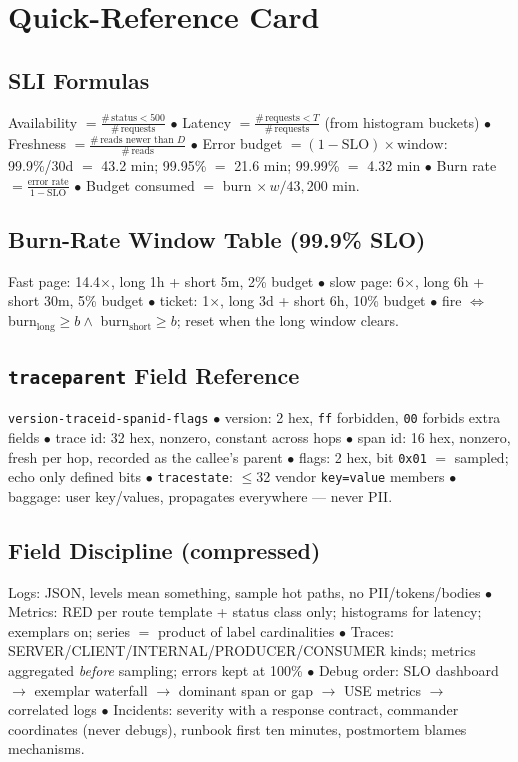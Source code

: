 \section{Quick-Reference Card}
\label{sec:ch18-quickref}

\subsection*{SLI Formulas}
Availability $= \frac{\#\,\text{status} < 500}{\#\,\text{requests}}$
$\bullet$ Latency $= \frac{\#\,\text{requests} < T}{\#\,\text{requests}}$
(from histogram buckets) $\bullet$ Freshness $= \frac{\#\,\text{reads newer
than } D}{\#\,\text{reads}}$ $\bullet$ Error budget $= (1-\text{SLO}) \times
\text{window}$: 99.9\%/30d $=$ 43.2 min; 99.95\% $=$ 21.6 min; 99.99\% $=$
4.32 min $\bullet$ Burn rate $= \frac{\text{error rate}}{1 - \text{SLO}}$
$\bullet$ Budget consumed $=$ burn $\times\, w / 43{,}200$ min.

\subsection*{Burn-Rate Window Table (99.9\% SLO)}
Fast page: 14.4$\times$, long 1h + short 5m, 2\% budget $\bullet$ slow
page: 6$\times$, long 6h + short 30m, 5\% budget $\bullet$ ticket:
1$\times$, long 3d + short 6h, 10\% budget $\bullet$ fire $\iff$
burn$_{\text{long}} \ge b \land$ burn$_{\text{short}} \ge b$; reset when
the long window clears.

\subsection*{\texttt{traceparent} Field Reference}
\texttt{version-traceid-spanid-flags} $\bullet$ version: 2 hex,
\texttt{ff} forbidden, \texttt{00} forbids extra fields $\bullet$ trace id:
32 hex, nonzero, constant across hops $\bullet$ span id: 16 hex, nonzero,
fresh per hop, recorded as the callee's parent $\bullet$ flags: 2 hex, bit
\texttt{0x01} $=$ sampled; echo only defined bits $\bullet$
\texttt{tracestate}: $\le$32 vendor \texttt{key=value} members $\bullet$
baggage: user key/values, propagates everywhere --- never PII.

\subsection*{Field Discipline (compressed)}
Logs: JSON, levels mean something, sample hot paths, no PII/tokens/bodies
$\bullet$ Metrics: RED per route template + status class only; histograms
for latency; exemplars on; series $=$ product of label cardinalities
$\bullet$ Traces: SERVER/CLIENT/INTERNAL/PRODUCER/CONSUMER kinds; metrics
aggregated \emph{before} sampling; errors kept at 100\% $\bullet$ Debug
order: SLO dashboard $\to$ exemplar waterfall $\to$ dominant span or gap
$\to$ USE metrics $\to$ correlated logs $\bullet$ Incidents: severity with
a response contract, commander coordinates (never debugs), runbook first
ten minutes, postmortem blames mechanisms.


